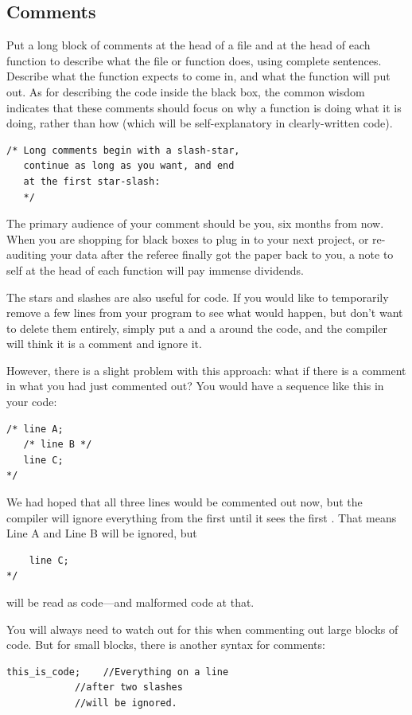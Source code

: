 

\subsection{Comments} 
Put a long block of comments 
at the head of a file and at the head of each function to describe what
the file or function does, using complete sentences. Describe what the
function expects to come in, and what the function will put out.
As for describing the code inside the black box, the common wisdom
indicates that these comments should focus on why a function is doing what it is doing,
rather than how (which will be self-explanatory in clearly-written code).
\begin{lstlisting}
/* Long comments begin with a slash-star,
   continue as long as you want, and end 
   at the first star-slash:   
   */
\end{lstlisting}

The primary audience of your comment should be you, six months from
now. When you are shopping for black boxes to plug in to your next project,
or re-auditing your data after the referee finally got the paper back
to you, a note to self at the head of each function will pay immense
dividends. 


The stars and slashes are also useful for  code. If
you would like to temporarily remove a few lines from your program to
see what would happen, but don't want to delete them entirely, simply
put a \ci{/*} and a \ci{*/} around the code, and the compiler will think
it is a comment and ignore it.

However, there is a slight problem with this approach: what if there is a comment in what you had just
commented out? You would have a sequence like this in your code: 
\begin{lstlisting}
/* line A; 
   /* line B */ 
   line C; 
*/
\end{lstlisting}
We had hoped that all three lines would be commented out now, but the compiler will ignore everything
from the first \ci{/*} until it sees the first \ci{*/}. That means Line A and Line B will be ignored,
but 
\begin{lstlisting}
    line C; 
*/
\end{lstlisting}
will be read as code---and malformed code at that.

You will always need to watch out for this when commenting out large blocks of code. But for small
blocks, there is another syntax for comments:
\begin{lstlisting}
this_is_code;    //Everything on a line 
            //after two slashes 
            //will be ignored.
\end{lstlisting}

